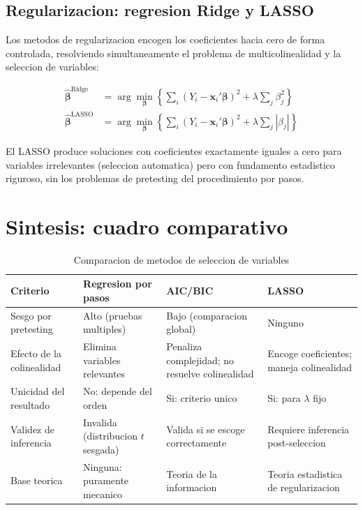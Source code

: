 \documentclass[12pt, letterpaper]{article}
\theoremstyle{remark}
\begin{document}
\subsection{Regularizacion: regresion Ridge y LASSO}

Los metodos de regularizacion encogen los coeficientes hacia cero de forma
controlada, resolviendo simultaneamente el problema de multicolinealidad y
la seleccion de variables:

\begin{align}
  \hat{\boldsymbol\beta}^{\text{Ridge}} &= \arg\min_{\boldsymbol\beta}
    \left\{ \sum_i (Y_i - \mathbf{x}_i'\boldsymbol\beta)^2
            + \lambda \sum_j \beta_j^2 \right\}
  \label{eq:Ridge}\\
  \hat{\boldsymbol\beta}^{\text{LASSO}} &= \arg\min_{\boldsymbol\beta}
    \left\{ \sum_i (Y_i - \mathbf{x}_i'\boldsymbol\beta)^2
            + \lambda \sum_j |\beta_j| \right\}
  \label{eq:LASSO}
\end{align}

El LASSO produce soluciones con coeficientes exactamente iguales a cero
para variables irrelevantes (seleccion automatica) pero con fundamento
estadistico riguroso, sin los problemas de pretesting del procedimiento
por pasos.

\section{Sintesis: cuadro comparativo}

\begin{table}[ht]
\centering
\caption{Comparacion de metodos de seleccion de variables}
\label{tab:comparacion}
\small
\begin{tabular}{p{3.5cm} p{3.5cm} p{3.5cm} p{3cm}}
\toprule
\textbf{Criterio}
  & \textbf{Regresion por pasos}
  & \textbf{AIC/BIC}
  & \textbf{LASSO} \\
\midrule
Sesgo por pretesting
  & Alto (pruebas multiples)
  & Bajo (comparacion global)
  & Ninguno \\[4pt]
Efecto de la colinealidad
  & Elimina variables relevantes
  & Penaliza complejidad; no resuelve colinealidad
  & Encoge coeficientes; maneja colinealidad \\[4pt]
Unicidad del resultado
  & No: depende del orden
  & Si: criterio unico
  & Si: para $\lambda$ fijo \\[4pt]
Validez de inferencia
  & Invalida (distribucion $t$ sesgada)
  & Valida si se escoge correctamente
  & Requiere inferencia post-seleccion \\[4pt]
Base teorica
  & Ninguna: puramente mecanico
  & Teoria de la informacion
  & Teoria estadistica de regularizacion \\
\bottomrule
\end{tabular}
\end{table}
\end{document}
